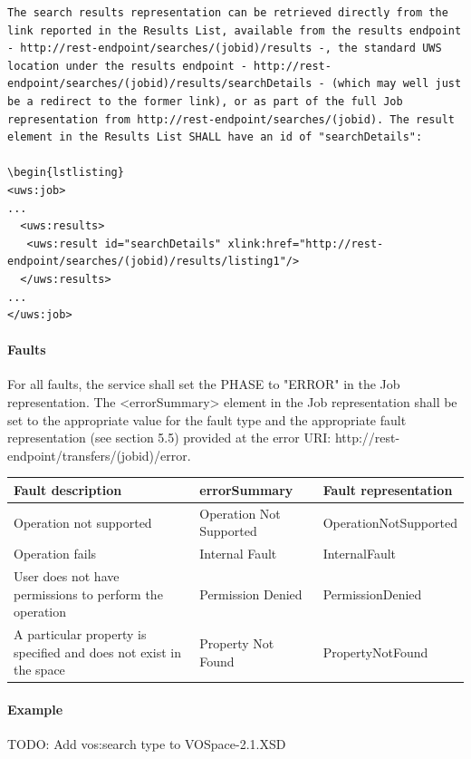 \documentclass[11pt,a4paper]{ivoa}
\begin{document}
\begin{lstlisting}
The search results representation can be retrieved directly from the link reported in the Results List, available from the results endpoint - http://rest-endpoint/searches/(jobid)/results -, the standard UWS location under the results endpoint - http://rest-endpoint/searches/(jobid)/results/searchDetails - (which may well just be a redirect to the former link), or as part of the full Job representation from http://rest-endpoint/searches/(jobid). The result element in the Results List SHALL have an id of "searchDetails":

\begin{lstlisting}
<uws:job>
...
  <uws:results>
   <uws:result id="searchDetails" xlink:href="http://rest-endpoint/searches/(jobid)/results/listing1"/>
  </uws:results>
...
</uws:job>
\end{lstlisting}

\paragraph{Faults}
For all faults, the service shall set the PHASE to "ERROR" in the Job representation. The <errorSummary> element in the Job representation shall be set to the appropriate value for the fault type and the appropriate fault representation (see section 5.5) provided at the error URI: http://rest-endpoint/transfers/(jobid)/error.

\vspace{3mm}
\begin{tabular}{ p{5cm} l p{4cm} }
\textbf{Fault description} & \textbf{errorSummary} & \textbf{Fault representation} \\
\hline
Operation not supported & Operation Not Supported & OperationNotSupported \\
\hline
Operation fails & Internal Fault & InternalFault \\
\hline
User does not have permissions to perform the operation	 & Permission Denied & PermissionDenied \\
\hline
A particular property is specified and does not exist in the space & Property Not Found & PropertyNotFound \\
\hline
\end{tabular}
\vspace{3mm}

\paragraph{Example}

TODO: Add vos:search type to VOSpace-2.1.XSD
\end{document}
